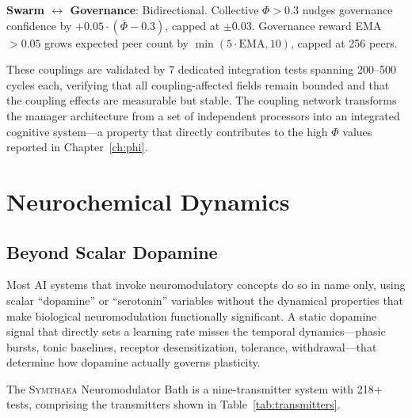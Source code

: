 \documentclass[12pt]{book}
\newcommand{\symthaea}{\textsc{Symthaea}}
\begin{document}
\textbf{Swarm $\leftrightarrow$ Governance}: Bidirectional. Collective $\Phi > 0.3$ nudges governance confidence by $+0.05 \cdot (\bar{\Phi} - 0.3)$, capped at $\pm 0.03$. Governance reward EMA $> 0.05$ grows expected peer count by $\min(5 \cdot \text{EMA}, 10)$, capped at 256 peers.

These couplings are validated by 7 dedicated integration tests spanning 200--500 cycles each, verifying that all coupling-affected fields remain bounded and that the coupling effects are measurable but stable. The coupling network transforms the manager architecture from a set of independent processors into an integrated cognitive system---a property that directly contributes to the high $\Phi$ values reported in Chapter~\ref{ch:phi}.


\chapter{Neurochemical Dynamics}
\label{ch:neuro}

\section{Beyond Scalar Dopamine}

Most AI systems that invoke neuromodulatory concepts do so in name only, using scalar ``dopamine'' or ``serotonin'' variables without the dynamical properties that make biological neuromodulation functionally significant. A static dopamine signal that directly sets a learning rate misses the temporal dynamics---phasic bursts, tonic baselines, receptor desensitization, tolerance, withdrawal---that determine how dopamine actually governs plasticity.

The \symthaea{} Neuromodulator Bath is a nine-transmitter system with 218+ tests, comprising the transmitters shown in Table~\ref{tab:transmitters}.
\end{document}
